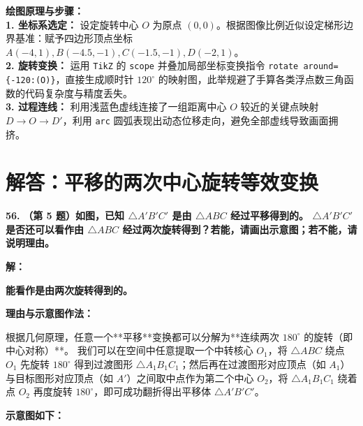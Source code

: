 \vspace{0.4cm}
{\small\color{blue!70!black}
\textbf{绘图原理与步骤：}\\
\textbf{1. 坐标系选定：} 设定旋转中心 $O$ 为原点 $(0,0)$。根据图像比例近似设定梯形边界基准：赋予四边形顶点坐标 $A(-4, 1), B(-4.5, -1), C(-1.5, -1), D(-2, 1)$。\\
\textbf{2. 旋转变换：} 运用 \texttt{TikZ} 的 \texttt{scope} 并叠加局部坐标变换指令 \texttt{rotate around=\{-120:(O)\}}，直接生成顺时针 $120^\circ$ 的映射图，此举规避了手算各类浮点数三角函数的代码复杂度与精度丢失。\\
\textbf{3. 过程连线：} 利用浅蓝色虚线连接了一组距离中心 $O$ 较近的关键点映射 $D \to O \to D'$，利用 \texttt{arc} 圆弧表现出动态位移走向，避免全部虚线导致画面拥挤。
}

\newpage



\section{解答：平移的两次中心旋转等效变换}

\vspace{0.6cm}

\textbf{\LARGE 56.} \textbf{（第 5 题）如图，已知 $\triangle A'B'C'$ 是由 $\triangle ABC$ 经过平移得到的。 $\triangle A'B'C'$ 是否还可以看作由 $\triangle ABC$ 经过两次旋转得到？若能，请画出示意图；若不能，请说明理由。}

\vspace{0.4cm}
\textbf{解：}

\textbf{能看作是由两次旋转得到的。}

\textbf{理由与示意图作法：} 

根据几何原理，任意一个**平移**变换都可以分解为**连续两次 $180^\circ$ 的旋转（即中心对称）**。
我们可以在空间中任意提取一个中转核心 $O_1$，将 $\triangle ABC$ 绕点 $O_1$ 先旋转 $180^\circ$ 得到过渡图形 $\triangle A_1B_1C_1$；然后再在过渡图形对应顶点（如 $A_1$）与目标图形对应顶点（如 $A'$）之间取中点作为第二个中心 $O_2$，将 $\triangle A_1B_1C_1$ 绕着点 $O_2$ 再度旋转 $180^\circ$，即可成功翻折得出平移体 $\triangle A'B'C'$。

\textbf{示意图如下：}

